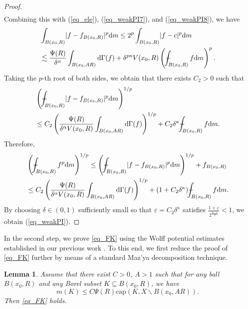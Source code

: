 \documentclass[11pt,a4paper]{article}
\numberwithin{equation}{section}
\def\Xint#1{\mathchoice
{\XXint\displaystyle\textstyle{#1}}%
{\XXint\textstyle\scriptstyle{#1}}%
{\XXint\scriptstyle\scriptscriptstyle{#1}}%
{\XXint\scriptscriptstyle\scriptscriptstyle{#1}}%
\!\int}
\def\XXint#1#2#3{{\setbox0=\hbox{$#1{#2#3}{\int}$ }
\vcenter{\hbox{$#2#3$ }}\kern-.6\wd0}}
\def\dashint{\Xint-}
\theoremstyle{plain}
\newtheorem{lemma}[theorem]{Lemma}
\theoremstyle{definition}
\begin{document}
\begin{proof}
\begin{align*}
\end{align*}
Combining this with (\ref{eq_ele}), (\ref{eq_weakPI7}), and (\ref{eq_weakPI8}), we have
\begin{align*}
&\int_{B(x_0,R)} \lvert f-f_{B(x_0,R)}\rvert^p \mathrm{d}m\le 2^p \int_{B(x_0,R)} \lvert f-c\rvert^p \mathrm{d}m\\
&\lesssim \frac{\Psi(R)}{\delta^\alpha}\int_{B(x_0,AR)}\mathrm{d}\Gamma(f)+\delta^{p\kappa}V(x_0,R)\left(\dashint_{B(x_0,R)}f \mathrm{d}m\right)^p.
\end{align*}
Taking the $p$-th root of both sides, we obtain that there exists $C_2>0$ such that
\begin{align*}
&\left(\dashint_{B(x_0,R)} \lvert f-f_{B(x_0,R)}\rvert^p \mathrm{d}m\right)^{1/p}\\
&\le C_2 \left(\frac{\Psi(R)}{\delta^\alpha V(x_0,R)}\int_{B(x_0,AR)}\mathrm{d}\Gamma(f)\right)^{1/p}+C_2\delta^\kappa \dashint_{B(x_0,R)}f \mathrm{d}m.
\end{align*}
Therefore,
\begin{align*}
&\left(\dashint_{B(x_0,R)} f^p \mathrm{d}m\right)^{1/p}\le\left(\dashint_{B(x_0,R)} \lvert f-f_{B(x_0,R)}\rvert^p \mathrm{d}m\right)^{1/p}+f_{B(x_0,R)}\\
&\le C_2 \left(\frac{\Psi(R)}{\delta^\alpha V(x_0,R)}\int_{B(x_0,AR)}\mathrm{d}\Gamma(f)\right)^{1/p}+(1+C_2\delta^\kappa) \dashint_{B(x_0,R)}f \mathrm{d}m.
\end{align*}
By choosing $\delta\in(0,1)$ sufficiently small so that $\varepsilon=C_2\delta^\kappa$ satisfies $\frac{1+\varepsilon}{2^{\frac{p-1}{p}}}<1$, we obtain (\ref{eq_weakPI}).
\end{proof}

In the second step, we prove \ref{eq_FK} using the Wolff potential estimates established in our previous work \cite{Yan25d}. To this end, we first reduce the proof of \ref{eq_FK} further by means of a standard Maz'ya decomposition technique.

\begin{lemma}\label{lem_FK}
Assume that there exist $C>0$, $A>1$ such that for any ball $B(x_0,R)$ and any Borel subset $K\subseteq B(x_0,R)$, we have
\begin{equation}\label{eq_mcap}
m(K)\le C \Psi(R) \mathrm{cap}(K,X\backslash B(x_0,AR)).
\end{equation}
Then \ref{eq_FK} holds.
\end{lemma}
\end{document}
